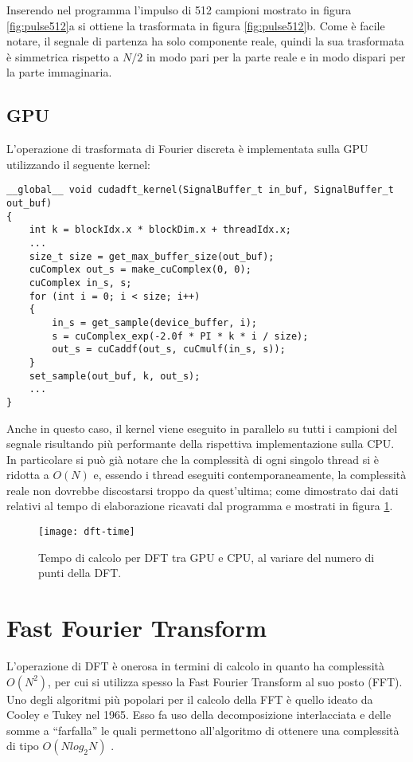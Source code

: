Inserendo nel programma l'impulso di 512 campioni mostrato in figura \ref{fig:pulse512}a si ottiene la trasformata in figura \ref{fig:pulse512}b. Come è facile notare, il segnale di partenza ha solo componente reale, quindi la sua trasformata è simmetrica rispetto a $N/2$ in modo pari per la parte reale e in modo dispari per la parte immaginaria.

\subsection{GPU}
L'operazione di trasformata di Fourier discreta è implementata sulla GPU utilizzando il seguente kernel:

\begin{lstlisting}
__global__ void cudadft_kernel(SignalBuffer_t in_buf, SignalBuffer_t out_buf)
{
    int k = blockIdx.x * blockDim.x + threadIdx.x;
    ...
    size_t size = get_max_buffer_size(out_buf);
    cuComplex out_s = make_cuComplex(0, 0);
    cuComplex in_s, s;
    for (int i = 0; i < size; i++)
    {
        in_s = get_sample(device_buffer, i);
        s = cuComplex_exp(-2.0f * PI * k * i / size);
        out_s = cuCaddf(out_s, cuCmulf(in_s, s));
    }
    set_sample(out_buf, k, out_s);
    ...
}

\end{lstlisting}

Anche in questo caso, il kernel viene eseguito in parallelo su tutti i campioni del segnale risultando più performante della rispettiva implementazione sulla CPU. In particolare si può già notare che la complessità di ogni singolo thread si è ridotta a $O(N)$ e, essendo i thread eseguiti contemporaneamente, la complessità reale non dovrebbe discostarsi troppo da quest'ultima; come dimostrato dai dati relativi al tempo di elaborazione ricavati dal programma e mostrati in figura \ref{fig:dfttime}.

\begin{figure}[h!]
    \centering
    \texttt{[image: dft-time]}
    \caption{Tempo di calcolo per DFT tra GPU e CPU, al variare del numero di punti della DFT.}
    \label{fig:dfttime}
\end{figure}

\section{Fast Fourier Transform}
L'operazione di DFT è onerosa in termini di calcolo in quanto ha complessità $O(N^2)$, per cui si utilizza spesso la Fast Fourier Transform al suo posto (FFT). Uno degli algoritmi più popolari per il calcolo della FFT è quello ideato da Cooley e Tukey nel 1965. Esso fa uso della decomposizione interlacciata e delle somme a ``farfalla'' le quali permettono all'algoritmo di ottenere una complessità di tipo $O(N log_2N)$ \cite{cooleytukey}.

